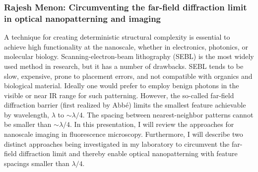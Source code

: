     \subsubsection*{Rajesh Menon: Circumventing the far-field diffraction limit
in optical nanopatterning and imaging}

A technique for creating deterministic structural complexity is essential to
achieve high functionality at the
nanoscale, whether in electronics, photonics, or molecular biology.
Scanning-electron-beam lithography (SEBL) is
the most widely used method in research, but it has a number of drawbacks. SEBL
tends to be slow, expensive,
prone to placement errors, and not compatible with organics and biological
material. Ideally one would prefer to
employ benign photons in the visible or near IR range for such patterning.
However, the so-called far-field
diffraction barrier (first realized by Abb\'e) limits the smallest feature
achievable by wavelength, $\lambda$ to $\sim \lambda / 4$. The
spacing between nearest-neighbor patterns cannot be smaller than $\sim \lambda /
4$.
In this presentation, I will review the approaches for nanoscale imaging in
fluorescence microscopy.
Furthermore, I will describe two distinct approaches being investigated in my
laboratory to circumvent the far-field
diffraction limit and thereby enable optical nanopatterning with feature
spacings smaller than $\lambda / 4$.

% 
% 
% 
% 
% 
% 
    
